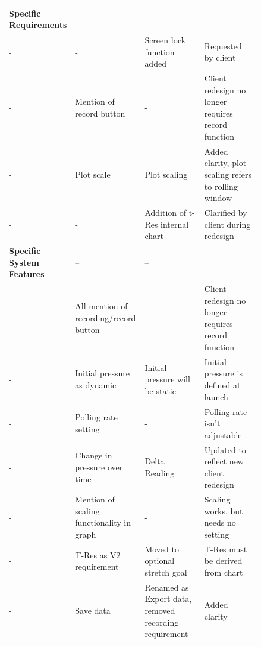 \documentclass[onecolumn, draftclsnofoot,10pt, compsoc]{IEEEtran}
\begin{document}
\begin{center}
\begin{longtable}{| l | p{0.28\linewidth} | p{0.28\linewidth} | p{0.28\linewidth} |}
		\textbf{Specific Requirements} & -- & -- \\ \hline
		- & - & Screen lock function added & Requested by client \\ \hline
		- & Mention of record button & - & Client redesign no longer requires record function \\ \hline
		- & Plot scale & Plot scaling & Added clarity, plot scaling refers to rolling window \\ \hline
		- & - & Addition of t-Res internal chart & Clarified by client during redesign \\ \hline \hline
		\textbf{Specific System Features} & -- & -- \\ \hline
		- & All mention of recording/record button & - & Client redesign no longer requires record function \\ \hline
		- & Initial pressure as dynamic & Initial pressure will be static & Initial pressure is defined at launch \\ \hline
		- & Polling rate setting & - & Polling rate isn't adjustable \\ \hline
		- & Change in pressure over time & Delta Reading & Updated to reflect new client redesign \\ \hline
		- & Mention of scaling functionality in graph & - & Scaling works, but needs no setting \\ \hline
		- & T-Res as V2 requirement & Moved to optional stretch goal & T-Res must be derived from chart \\ \hline
		- & Save data & Renamed as Export data, removed recording requirement & Added clarity \\ \hline


\end{longtable}
\end{center}
\end{document}
